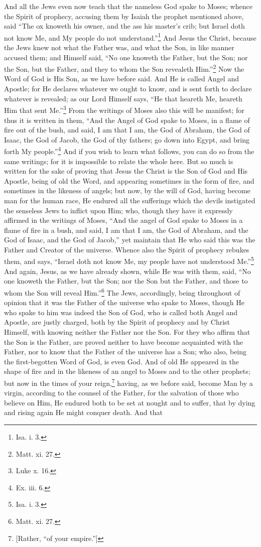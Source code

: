 And all the Jews even now teach that the nameless God spake to Moses; whence the Spirit of prophecy, accusing them by Isaiah the prophet mentioned above, said “The ox knoweth his owner, and the ass his master’s crib; but Israel doth not know Me, and My people do not understand.”\footnote{Isa. i. 3.} And Jesus the Christ, because the Jews knew not what the Father was, and what the Son, in like manner accused them; and Himself said, “No one knoweth the Father, but the Son; nor the Son, but the Father, and they to whom the Son revealeth Him.”\footnote{Matt. xi. 27.} Now the Word of God is His Son, as we have before said. And He is called Angel and Apostle; for He declares whatever we ought to know, and is sent forth to declare whatever is revealed; as our Lord Himself says, “He that heareth Me, heareth Him that sent Me.”\footnote{Luke x. 16.} From the writings of Moses also this will be manifest; for thus it is written in them, “And the Angel of God spake to Moses, in a flame of fire out of the bush, and said, I am that I am, the God of Abraham, the God of Isaac, the God of Jacob, the God of thy fathers; go down into Egypt, and bring forth My people.”\footnote{Ex. iii. 6.} And if you wish to learn what follows, you can do so from the same writings; for it is impossible to relate the whole here. But so much is written for the sake of proving that Jesus the Christ is the Son of God and His Apostle, being of old the Word, and appearing sometimes in the form of fire, and sometimes in the likeness of angels; but now, by the will of God, having become man for the human race, He endured all the sufferings which the devils instigated the senseless Jews to inflict upon Him; who, though they have it expressly affirmed in the writings of Moses, “And the angel of God spake to Moses in a flame of fire in a bush, and said, I am that I am, the God of Abraham, and the God of Isaac, and the God of Jacob,” yet maintain that He who said this was the Father and Creator of the universe. Whence also the Spirit of prophecy rebukes them, and says, “Israel doth not know Me, my people have not understood Me.”\footnote{Isa. i. 3.} And again, Jesus, as we have already shown, while He was with them, said, “No one knoweth the Father, but the Son; nor the Son but the Father, and those to whom the Son will reveal Him.”\footnote{Matt. xi. 27.} The Jews, accordingly, being throughout of opinion that it was the Father of the universe who spake to Moses, though He who spake to him was indeed the Son of God, who is called both Angel and Apostle, are justly charged, both by the Spirit of prophecy and by Christ Himself, with knowing neither the Father nor the Son. For they who affirm that the Son is the Father, are proved neither to have become acquainted with the Father, nor to know that the Father of the universe has a Son; who also, being the first-begotten Word of God, is even God. And of old He appeared in the shape of fire and in the likeness of an angel to Moses and to the other prophets; but now in the times of your reign,\footnote{[Rather, “of your empire.”]} having, as we before said, become Man by a virgin, according to the counsel of the Father, for the salvation of those who believe on Him, He endured both to be set at nought and to suffer, that by dying and rising again He might conquer death. And that 